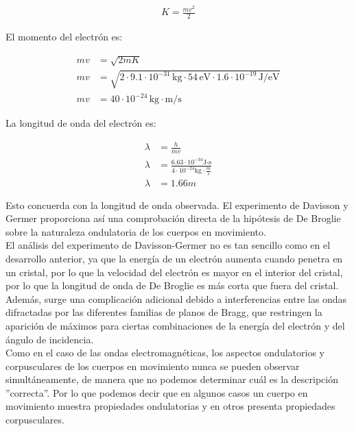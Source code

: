 \documentclass[a4paper]{article}
\begin{document}
    \begin{align}
        K=\frac{mv^2}{2} \tag*{} 
    \end{align}

    \indent El momento del electrón es:

    \begin{align}
        mv &=\sqrt{2mK} \tag*{} \\[10pt]
        mv &=\sqrt{2 \cdot 9.1 \cdot 10^{-31} \, \text{kg} \cdot 54 \, \text{eV} \cdot 1.6 \cdot 10^{-19} \, \text{J/eV}} \tag*{} \\[10pt]
        mv &= 40 \cdot 10^{-24} \, \text{kg} \cdot \text{m/s} \tag*{}
    \end{align}

    \indent La longitud de onda del electrón es:

    \begin{align}
        \lambda &= \frac{h}{mv} \tag*{} \\[10pt]
        \lambda &= \frac{6.63 \cdot 10^{-34} \text{J-s}}{4 \cdot 10^{-24} \text{kg} \cdot \frac {m}{s}} \tag*{} \\[10pt]
        \lambda &= 1.66m \tag*{}
    \end{align}

    \indent Esto concuerda con la longitud de onda observada. El experimento de Davisson y Germer proporciona así una comprobación directa de la hipótesis de De Broglie sobre la naturaleza ondulatoria de los cuerpos en movimiento.\\
    \indent El análisis del experimento de Davisson-Germer no es tan sencillo como en el desarrollo anterior, ya que la energía de un electrón aumenta cuando penetra en un cristal, por lo que la velocidad del electrón es mayor en el interior del cristal, por lo que la longitud de onda de De Broglie es más corta que fuera del cristal. Además, surge una complicación adicional debido a interferencias entre las ondas difractadas por las diferentes familias de planos de Bragg, que restringen la aparición de máximos para ciertas combinaciones de la energía del electrón y del ángulo de incidencia.\\

\indent Como en el caso de las ondas electromagnéticas, los aspectos ondulatorios y corpusculares de los cuerpos en movimiento nunca se pueden observar simultáneamente, de manera que no podemos determinar cuál es la descripción ''correcta''. Por lo que podemos decir que en algunos casos un cuerpo en movimiento muestra propiedades ondulatorias y en otros presenta propiedades corpusculares. 
\end{document}
